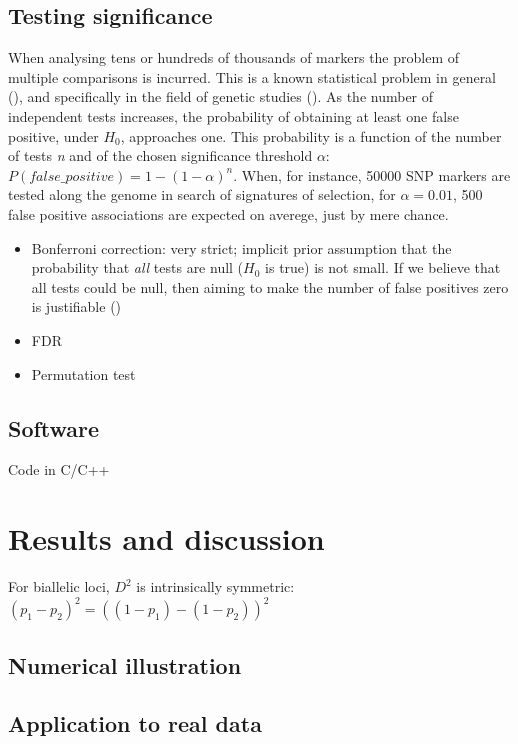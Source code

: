 \documentclass{bmcart}
\begin{document}
\subsection*{Testing significance}

When analysing tens or hundreds of thousands of markers the problem of
multiple comparisons is incurred. This is a known statistical problem in general
(\cite{berry2007difficult}), and specifically in the field of genetic
studies (\cite{lander1994genetic,risch1996future}). As the number of
independent tests increases, the probability of obtaining at least one
false positive, under $H_0$, approaches one. This probability is a
function of the number of tests \emph{n} and of the chosen significance
threshold \emph{\(\alpha\)}: \(P(false\_positive)=1-(1-\alpha)^n\). When, for instance,
50000 SNP markers are tested along the genome in search of signatures of
selection, for $\alpha=0.01$, 500 false positive associations are expected on averege, just
by mere chance. 


\begin{itemize}
\item Bonferroni correction: very strict; implicit prior assumption that the
probability that \emph{all} tests are null ($H_0$ is true) is not small. If we believe
that all tests could be null, then aiming to make the number of false
positives zero is justifiable (\cite{wakefield2008reporting})
\item FDR
\item Permutation test
\end{itemize}

\subsection*{Software}
Code in C/C++


\section*{Results and discussion}
For biallelic loci, $D^2$ is intrinsically symmetric: $(p_1-p_2)^2 =
((1-p_1)-(1-p_2))^2$

\subsection*{Numerical illustration}

\subsection*{Application to real data}
\end{document}
